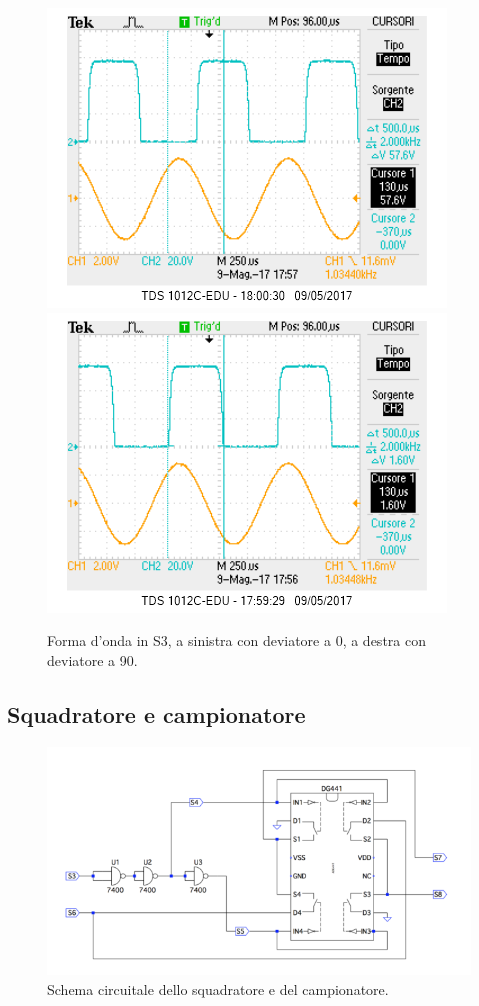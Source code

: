 \documentclass[10pt,a4paper]{article}
\begin{document}
\begin{figure}[!htb]
  \includegraphics[scale=0.75]{deviatore0.png}\includegraphics[scale=0.75]{deviatore90.png}
\caption{Forma d'onda in S3, a sinistra con deviatore a 0\degree, a destra con deviatore a 90\degree.\label{osc:dev}}
\end{figure}

\subsection{Squadratore e campionatore}

\begin{figure}[!htb]
  \centering
  \includegraphics[scale=0.75]{sqadratore-campionatore.png}
\caption{Schema circuitale dello squadratore e del campionatore.\label{fig:sqadratore-campionatore}}
\end{figure}
\end{document}
